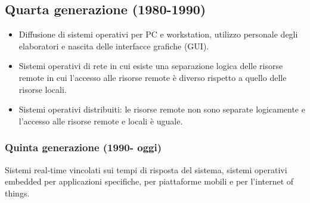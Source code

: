 \subsection{Quarta generazione (1980-1990)}
\begin{itemize}
\item Diffusione di sistemi operativi per PC e workstation, utilizzo personale degli elaboratori e nascita delle interfacce grafiche (GUI).
\item Sistemi operativi di rete in cui esiste una separazione logica delle risorse remote in cui l'accesso alle risorse remote \`e diverso rispetto a quello 
delle risorse locali.
\item Sistemi operativi distribuiti: le risorse remote non sono separate logicamente e l'accesso alle risorse remote e locali \`e uguale. 
\end{itemize}
\subsubsection{Quinta generazione (1990- oggi)}
Sistemi real-time vincolati sui tempi di risposta del sistema, sistemi operativi embedded per applicazioni specifiche, per piattaforme mobili e per 
l'internet of things. 
